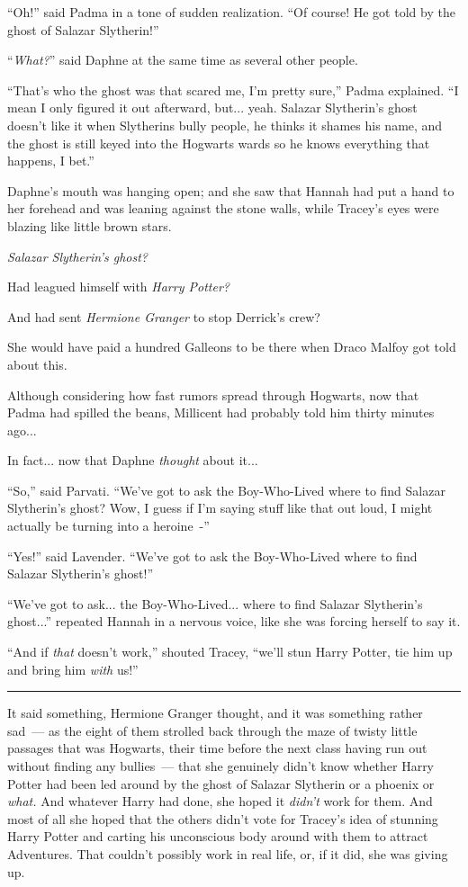 ``Oh!'' said Padma in a tone of sudden realization. ``Of course! He got told by the ghost of Salazar Slytherin!''

``\emph{What?}'' said Daphne at the same time as several other people.

``That's who the ghost was that scared me, I'm pretty sure,'' Padma explained. ``I mean I only figured it out afterward, but... yeah. Salazar Slytherin's ghost doesn't like it when Slytherins bully people, he thinks it shames his name, and the ghost is still keyed into the Hogwarts wards so he knows everything that happens, I bet.''

Daphne's mouth was hanging open; and she saw that Hannah had put a hand to her forehead and was leaning against the stone walls, while Tracey's eyes were blazing like little brown stars.

\emph{Salazar Slytherin's ghost?}

Had leagued himself with \emph{Harry Potter?}

And had sent \emph{Hermione Granger} to stop Derrick's crew?

She would have paid a hundred Galleons to be there when Draco Malfoy got told about this.

Although considering how fast rumors spread through Hogwarts, now that Padma had spilled the beans, Millicent had probably told him thirty minutes ago...

In fact... now that Daphne \emph{thought} about it...

``So,'' said Parvati. ``We've got to ask the Boy-Who-Lived where to find Salazar Slytherin's ghost? Wow, I guess if I'm saying stuff like that out loud, I might actually be turning into a heroine~-''

``Yes!'' said Lavender. ``We've got to ask the Boy-Who-Lived where to find Salazar Slytherin's ghost!''

``We've got to ask... the Boy-Who-Lived... where to find Salazar Slytherin's ghost...'' repeated Hannah in a nervous voice, like she was forcing herself to say it.

``And if \emph{that} doesn't work,'' shouted Tracey, ``we'll stun Harry Potter, tie him up and bring him \emph{with} us!''

\begin{center}\rule{3in}{0.4pt}\end{center}

It said something, Hermione Granger thought, and it was something rather sad~--- as the eight of them strolled back through the maze of twisty little passages that was Hogwarts, their time before the next class having run out without finding any bullies~--- that she genuinely didn't know whether Harry Potter had been led around by the ghost of Salazar Slytherin or a phoenix or \emph{what.} And whatever Harry had done, she hoped it \emph{didn't} work for them. And most of all she hoped that the others didn't vote for Tracey's idea of stunning Harry Potter and carting his unconscious body around with them to attract Adventures. That couldn't possibly work in real life, or, if it did, she was giving up.

